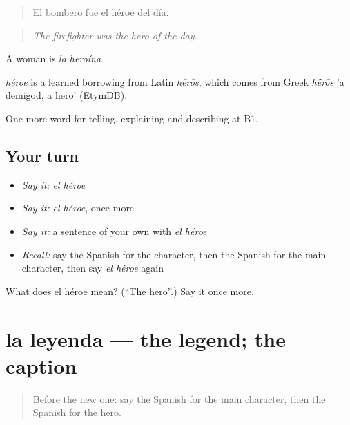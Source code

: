 \begin{quote}
El bombero fue el héroe del día.
\end{quote}

\begin{quote}
\emph{The firefighter was the hero of the day.}
\end{quote}

A woman is \emph{la heroína}.

\begin{cousinweb}
\emph{héroe} is a learned borrowing from Latin \emph{hērōs}, which comes from Greek \emph{h\'{\={e}}rōs} 'a demigod, a hero' (EtymDB).
\end{cousinweb}

\begin{grammarlens}[title={What you've built}]
One more word for telling, explaining and describing at B1.
\end{grammarlens}

\subsection*{Your turn}
\begin{itemize}
\raggedright
  \item \emph{Say it:} \emph{el héroe}
  \item \emph{Say it:} \emph{el héroe}, once more
  \item \emph{Say it:} a sentence of your own with \emph{el héroe}
  \item \emph{Recall:} say the Spanish for the character, then the Spanish for the main character, then say \emph{el héroe} again
\end{itemize}

\begin{tcolorbox}[breakable,colback=teal!4,colframe=teal!35!black,title={Before you move on}]
What does el héroe mean? (\textquotedblleft{}The hero\textquotedblright{}.) Say it once more.
\end{tcolorbox}
\section[la leyenda]{la leyenda — the legend; the caption}

\label{lesson:ES-C564-leyenda}



\begin{quote}
Before the new one: say the Spanish for the main character, then the Spanish for the hero.
\end{quote}

